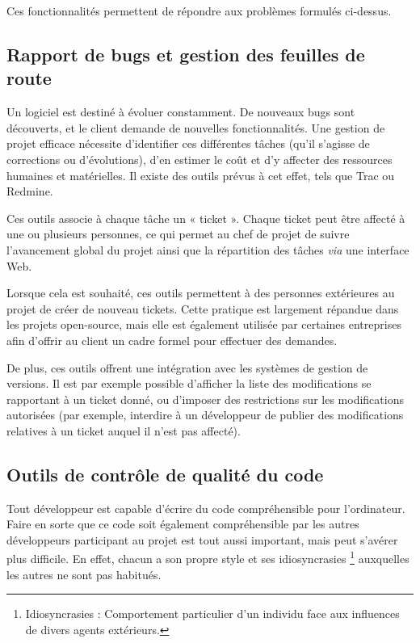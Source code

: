 
Ces fonctionnalités permettent de répondre aux problèmes formulés ci-dessus.

\subsection{Rapport de bugs et gestion des feuilles de route}

Un logiciel est destiné à évoluer constamment. De nouveaux bugs sont découverts, et le client demande de nouvelles fonctionnalités. Une gestion de projet efficace nécessite d’identifier ces différentes tâches (qu’il s’agisse de corrections ou d’évolutions), d’en estimer le coût et d’y affecter des ressources humaines et matérielles. Il existe des outils prévus à cet effet, tels que Trac ou Redmine.

Ces outils associe à chaque tâche un « ticket ». Chaque ticket peut être affecté à une ou plusieurs personnes, ce qui permet au chef de projet de suivre l’avancement global du projet ainsi que la répartition des tâches \textit{via} une interface Web.

Lorsque cela est souhaité, ces outils permettent à des personnes extérieures au projet de créer de nouveau tickets. Cette pratique est largement répandue dans les projets open-source, mais elle est également utilisée par certaines entreprises afin d’offrir au client un cadre formel pour effectuer des demandes.

De plus, ces outils offrent une intégration avec les systèmes de gestion de versions. Il est par exemple possible d’afficher la liste des modifications se rapportant à un ticket donné, ou d’imposer des restrictions sur les modifications autorisées (par exemple, interdire à un développeur de publier des modifications relatives à un ticket auquel il n’est pas affecté).

\subsection{Outils de contrôle de qualité du code}

Tout développeur est capable d’écrire du code compréhensible pour l’ordinateur. Faire en sorte que ce code soit également compréhensible par les autres développeurs participant au projet est tout aussi important, mais peut s’avérer plus difficile. En effet, chacun a son propre style et ses idiosyncrasies \footnote{Idiosyncrasies : Comportement particulier d'un individu face aux influences de divers agents extérieurs.} auxquelles les autres ne sont pas habitués.

